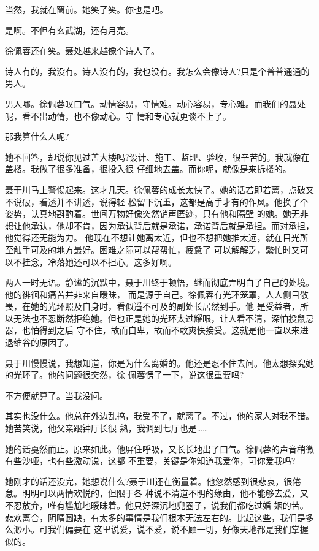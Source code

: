 \documentclass[11pt,a4paper,onecolumn]{article}
\begin{document}
当然，我就在窗前。她笑了笑。你也是吧。

是啊。不但有玄武湖，还有月亮。

徐佩蓉还在笑。聂处越来越像个诗人了。

诗人有的，我没有。诗人没有的，我也没有。我怎么会像诗人?只是个普普通通的男人。

男人哪。徐佩蓉叹口气。动情容易，守情难。动心容易，专心难。而我们的聂处呢，看不出动情，也不像动心。守
情和专心就更谈不上了。

那我算什么人呢?

她不回答，却说你见过盖大楼吗?设计、施工、监理、验收，很辛苦的。我就像在盖楼。我做了很多准备，很投入很
仔细地去盖。而你呢，就像是来拆楼的。

聂于川马上警惕起来。这才几天。徐佩蓉的成长太快了。她的话若即若离，点破又不说破，看透并不讲透，说得轻
松留下沉重，这都是高手才有的作风。他换了个姿势，认真地斟酌着。世间万物好像突然销声匿迹，只有他和隔壁
的她。她无非想让他承认，他却不肯，因为承认背后就是承诺，承诺背后就是承担。而对承担，他觉得还无能为力。
他现在不想让她离太近，但也不想把她推太远，就在目光所至触手可及的地方最好。困难之际可以帮帮忙，疲惫了
可以解解乏，繁忙时又可以不挂念，冷落她还可以不担心。这多好啊。

两人一时无语。静谧的沉默中，聂于川终于顿悟，继而彻底弄明白了自己的处境。他的徘徊和痛苦并非来自暧昧，
而是源于自己。徐佩蓉有光环笼罩，人人侧目敬畏，在她的光环照及自身时，看似遥不可及的副处长居然到手。他
是受益者，所以无法也不忍断然拒绝她。但也正是她的光环太过耀眼，让人看不清，深怕投鼠忌器，也怕得到之后
守不住，故而自卑，故而不敢爽快接受。这就是他一直以来进退维谷的原因了。

聂于川慢慢说，我想知道，你是为什么离婚的。他还是忍不住去问。他太想探究她的光环了。他的问题很突然，徐
佩蓉愣了一下，说这很重要吗?

不方便就算了。当我没问。

其实也没什么。他总在外边乱搞，我受不了，就离了。不过，他的家人对我不错。她苦笑说，他父亲跟钟厅长很
熟，我调到七厅也是……

她的话戛然而止。原来如此。他屏住呼吸，又长长地出了口气。徐佩蓉的声音稍微有些沙哑，也有些激动说，这都
不重要，关键是你知道我爱你，可你爱我吗?

她刚才的话还没完，她想说什么?聂于川还在衡量着。他忽然感到很悲哀，很倦怠。明明可以两情欢悦的，但限于各
种说不清道不明的缘由，他不能够去爱，又不忍放弃，唯有尴尬地暧昧着。他只好深沉地兜圈子，说我们都吃过婚
姻的苦。悲欢离合，阴晴圆缺，有太多的事情是我们根本无法左右的。比起这些，我们是多么渺小。可我们偏要在
这里说爱，说不爱，说不顾一切，好像天地都是我们掌握似的。
\end{document}
